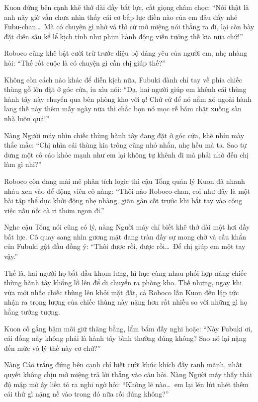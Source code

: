 \documentclass[../main.tex]{subfiles}
\begin{document}
Kuon đứng bên cạnh khẽ thở dài đầy bất lực, cất giọng châm chọc: ``Nói thật là anh nãy giờ vẫn chưa nhìn thấy cái cơ bắp lực điền nào của em đâu đấy nhé Fubu-chan\dots\ Mà có chuyện gì nhờ vả thì cứ mở miệng nói thẳng ra đi, lại còn bày đặt diễn sâu kể lể kịch tính như phim hành động viễn tưởng thế kia nữa chứ!''

Roboco cũng khẽ bật cười trừ trước điệu bộ đáng yêu của người em, nhẹ nhàng hỏi: ``Thế rốt cuộc là có chuyện gì cần chị giúp thế?''

Không còn cách nào khác để diễn kịch nữa, Fubuki đành chỉ tay về phía chiếc thùng gỗ lớn đặt ở góc cửa, ỉu xìu nói: ``Dạ, hai người giúp em khênh cái thùng hành tây này chuyển qua bên phòng kho với ạ! Chứ cứ để nó nằm xó ngoài hành lang thế này thêm mấy ngày nữa thì chắc bọn nó mọc rễ bám chặt xuống sàn nhà luôn quá!''

Nàng Người máy nhìn chiếc thùng hành tây đang đặt ở góc cửa, khẽ nhíu mày thắc mắc: ``Chị nhìn cái thùng kia trông cũng nhỏ nhắn, nhẹ hều mà ta. Sao tự dưng một cô cáo khỏe mạnh như em lại không tự khênh đi mà phải nhờ đến chị làm gì nhỉ?''

Roboco còn đang mải mê phân tích logic thì cậu Tổng quản lý Kuon đã nhanh nhảu xen vào để động viên cô nàng: ``Thôi nào Roboco-chan, coi như đây là một bài tập thể dục khởi động nhẹ nhàng, giãn gân cốt trước khi bắt tay vào công việc nấu nồi cà ri thơm ngon đi.''

Nghe cậu Tổng nói cũng có lý, nàng Người máy chỉ biết khẽ thở dài một hơi đầy bất lực. Cô quay sang nhìn gương mặt đang tràn đầy sự mong chờ và cầu khẩn của Fubuki gật đầu đồng ý: ``Thôi được rồi, được rồi\dots\ Để chị giúp em một tay vậy.''

Thế là, hai người họ bắt đầu khom lưng, hì hục cùng nhau phối hợp nâng chiếc thùng hành tây khổng lồ lên để di chuyển ra phòng kho. Thế nhưng, ngay khi vừa mới nhấc chiếc thùng lên khỏi mặt đất, cả Roboco lẫn Kuon đều lập tức nhận ra trọng lượng của chiếc thùng này nặng hơn rất nhiều so với những gì họ hằng tưởng tượng.

Kuon cố gắng bậm môi giữ thăng bằng, lẩm bẩm đầy nghi hoặc: ``Này Fubuki ơi, cái đống này không phải là hành tây bình thường đúng không? Sao nó lại nặng đến mức vô lý thế này cơ chứ?''

Nàng Cáo trắng đứng bên cạnh chỉ biết cười khúc khích đầy ranh mãnh, nhất quyết không chịu mở miệng trả lời thẳng vào câu hỏi. Nàng Người máy thấy thái độ mập mờ ấy liền tỏ ra nghi ngờ hỏi: ``Không lẽ nào\dots\ em lại lén lút nhét thêm cái thứ gì nặng nề vào trong đó nữa rồi đúng không?''
\end{document}
